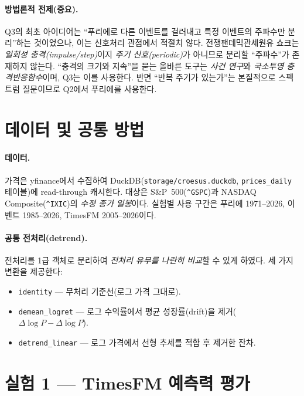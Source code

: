 \documentclass[11pt]{article}
\begin{document}
\paragraph{방법론적 전제(중요).}
Q3의 최초 아이디어는 ``푸리에로 다른 이벤트를 걸러내고 특정 이벤트의 주파수만 분리''하는 것이었으나, 이는 신호처리 관점에서 적절치 않다. 전쟁\textperiodcentered 팬데믹\textperiodcentered 관세\textperiodcentered 원유 쇼크는 \emph{일회성 충격(impulse/step)}이지 \emph{주기 신호(periodic)}가 아니므로 분리할 ``주파수''가 존재하지 않는다. ``충격의 크기와 지속''을 묻는 올바른 도구는 \emph{사건 연구}와 \emph{국소투영 충격반응함수}이며, Q3는 이를 사용한다. 반면 ``반복 주기가 있는가''는 본질적으로 스펙트럼 질문이므로 Q2에서 푸리에를 사용한다.

\section{데이터 및 공통 방법}

\paragraph{데이터.} 가격은 yfinance에서 수집하여 DuckDB(\texttt{storage/croesus.duckdb}, \texttt{prices\_daily} 테이블)에 read-through 캐시한다. 대상은 S\&P~500(\texttt{\^{}GSPC})과 NASDAQ Composite(\texttt{\^{}IXIC})의 \emph{수정 종가 일봉}이다. 실험별 사용 구간은 푸리에 1971--2026, 이벤트 1985--2026, TimesFM 2005--2026이다.

\paragraph{공통 전처리(detrend).} 전처리를 1급 객체로 분리하여 \emph{전처리 유무를 나란히 비교}할 수 있게 하였다. 세 가지 변환을 제공한다:
\begin{itemize}
  \item \texttt{identity} --- 무처리 기준선(로그 가격 그대로).
  \item \texttt{demean\_logret} --- 로그 수익률에서 평균 성장률(drift)을 제거($\Delta\log P - \overline{\Delta\log P}$).
  \item \texttt{detrend\_linear} --- 로그 가격에서 선형 추세를 적합 후 제거한 잔차.
\end{itemize}

\section{실험 1 --- TimesFM 예측력 평가}
\end{document}
